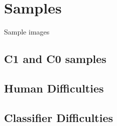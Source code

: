 \chapter{Samples}
\label{appendixD}
\thispagestyle{empty}

\noindent Sample images

\section{C1 and C0 samples}

\label{appendixD:samples}

\vspace{0.5cm}

\section{Human Difficulties}

\label{appendixD:h_diff}

\vspace{0.5cm}

\section{Classifier Difficulties}

\label{appendixD:cl_diff}

